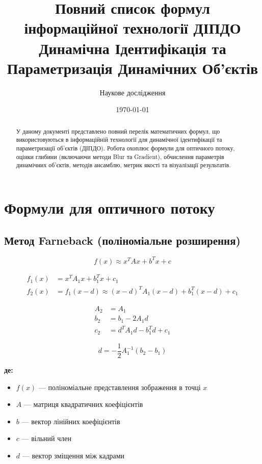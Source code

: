\documentclass[14pt, a4paper]{extarticle}
\title{Повний список формул\\інформаційної технології ДІПДО\\
\large{Динамічна Ідентифікація та Параметризація Динамічних Об'єктів}}
\author{Наукове дослідження}
\date{\today}
\numberwithin{equation}{section}
\begin{document}
\maketitle

\begin{abstract}
У даному документі представлено повний перелік математичних формул, що використовуються в інформаційній технології для динамічної ідентифікації та параметризації об'єктів (ДІПДО). Робота охоплює формули для оптичного потоку, оцінки глибини (включаючи методи Blur та Gradient), обчислення параметрів динамічних об'єктів, методів ансамблю, метрик якості та візуалізації результатів.
\end{abstract}

\tableofcontents

\newpage



\section{Формули для оптичного потоку}

\subsection{Метод Farneback (поліноміальне розширення)}

\begin{equation}
\boxed{f(x) \approx x^T A x + b^T x + c} \tag{1}
\end{equation}

\begin{align}
f_1(x) &= x^T A_1 x + b_1^T x + c_1 \tag{2} \\
f_2(x) &= f_1(x - d) \approx (x-d)^T A_1 (x-d) + b_1^T (x-d) + c_1 \tag{3}
\end{align}

\begin{align}
A_2 &= A_1 \tag{4} \\
b_2 &= b_1 - 2A_1 d \tag{5} \\
c_2 &= d^T A_1 d - b_1^T d + c_1 \tag{6}
\end{align}

\begin{equation}
\boxed{d = -\frac{1}{2} A_1^{-1} (b_2 - b_1)} \tag{7}
\end{equation}

\textbf{де:}
\begin{itemize}
\item $f(x)$ — поліноміальне представлення зображення в точці $x$
\item $A$ — матриця квадратичних коефіцієнтів
\item $b$ — вектор лінійних коефіцієнтів
\item $c$ — вільний член
\item $d$ — вектор зміщення між кадрами
\end{itemize}
\end{document}
